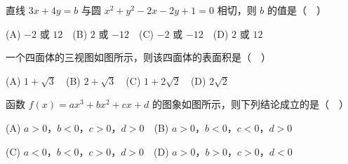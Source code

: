 \begin{question}
直线 \(3x+4y=b\) 与圆 \(x^2+y^2-2x-2y+1=0\) 相切，则 \(b\) 的值是（　）

(A) \(-2\) 或 \(12\)　(B) \(2\) 或 \(-12\)　(C) \(-2\) 或 \(-12\)　(D) \(2\) 或 \(12\)

\Needspace{0.4\textheight}
\end{question}
\begin{question}
一个四面体的三视图如图所示，则该四面体的表面积是（　）
\nopagebreak[4]
\begin{center}\end{center}
\nopagebreak[4]
(A) \(1+\sqrt{3}\)　(B) \(2+\sqrt{3}\)　(C) \(1+2\sqrt{2}\)　(D) \(2\sqrt{2}\)

\Needspace{0.4\textheight}
\end{question}
\begin{question}
函数 \(f(x)=ax^3+bx^2+cx+d\) 的图象如图所示，则下列结论成立的是（　）
\nopagebreak[4]
\begin{center}\end{center}
\nopagebreak[4]
(A) \(a>0\)，\(b<0\)，\(c>0\)，\(d>0\)　(B) \(a>0\)，\(b<0\)，\(c<0\)，\(d>0\)

(C) \(a<0\)，\(b<0\)，\(c>0\)，\(d>0\)　(D) \(a>0\)，\(b>0\)，\(c>0\)，\(d<0\)

\end{question}

